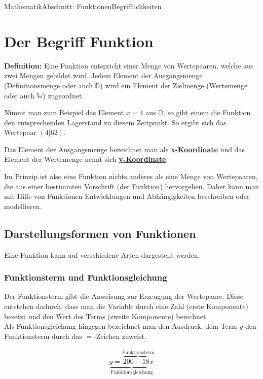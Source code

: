 \documentclass[11pt,twocolumn,oneside,openany,headings=optiontotoc,11pt,numbers=noenddot]{article}
\begin{document}
\begin{worksheet}{Mathematik}{Abschnitt: Funktionen}{Begrifflichkeiten}
		\section{Der Begriff \glqq{}Funktion\grqq{}}
		\begin{framed}
			\noindent
			\textbf{Definition:} Eine Funktion entspricht einer Menge von Wertepaaren, welche aus zwei Mengen gebildet wird. Jedem Element der Ausgangsmenge (Definitionsmenge oder auch \(\mathbb{D}\)) wird ein Element der Zielmenge (Wertemenge oder auch \(\mathbb{W}\)) zugeordnet.
		\end{framed}
		\noindent
		Nimmt man zum Beispiel das Element \(x=4\) aus \(\mathbb{D}\), so gibt einem die Funktion den entsprechenden Lagerstand zu diesem Zeitpunkt. So ergibt sich das Wertepaar \((4|62)\).\\
		\par\bigskip\noindent
		Das Element der Ausgangsmenge bezeichnet man als \underline{\textbf{x-Koordinate}} und das Element der Wertemenge nennt sich \underline{\textbf{y-Koordinate}}.\\
		\par\bigskip\noindent
		Im Prinzip ist also eine Funktion nichts anderes als eine Menge von Wertepaaren, die aus einer bestimmten Vorschrift (der Funktion) hervorgehen. Daher kann man mit Hilfe von Funktionen Entwicklungen und Abhängigkeiten beschreiben oder modellieren.
		\subsection{Darstellungsformen von Funktionen}
		Eine Funktion kann auf verschiedene Arten dargestellt werden.
		\subsubsection*{Funktionsterm und Funktionsgleichung}
		Der Funktionsterm gibt die Anweisung zur Erzeugung der Wertepaare. Diese entstehen dadurch, dass man die Variable durch eine Zahl (erste Komponente) besetzt und den Wert des Terms (zweite Komponente) berechnet.\\
		Als Funktionsgleichung hingegen bezeichnet man den Ausdruck, dem Term \(y\) den Funktionsterm durch das \glqq{}\(=\)\grqq{}-Zeichen zuweist.\\
		\par\bigskip\noindent
		\begin{align*}
			\underbrace{y = \overbrace{200 -18x}^{\text{Funktionsterm}}}_{\text{Funktionsgleichung}}
		\end{align*}

\end{worksheet}
\end{document}

